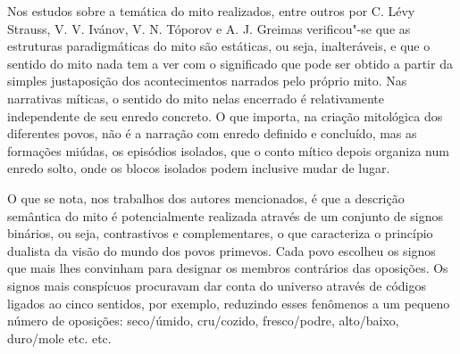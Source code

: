 Nos estudos sobre a temática do mito realizados, entre outros por C.
Lévy Strauss, V. V. Ivánov, V. N. Tóporov e A. J. Greimas
verificou"-se que as estruturas paradigmáticas do mito são estáticas, ou
seja, inalteráveis, e que o sentido do mito nada tem a ver com o
significado que pode ser obtido a partir da simples justaposição dos
acontecimentos narrados pelo próprio mito. Nas narrativas míticas, o
sentido do mito nelas encerrado é relativamente independente de seu
enredo concreto. O que importa, na criação mitológica dos diferentes
povos, não é a narração com enredo definido e concluído, mas as
formações miúdas, os episódios isolados, que o conto mítico depois
organiza num enredo solto, onde os blocos isolados podem inclusive mudar
de lugar.

O que se nota, nos trabalhos dos autores mencionados, é que a
descrição semântica do mito é potencialmente realizada através de um
conjunto de signos binários, ou seja, contrastivos e complementares,
o que caracteriza o princípio dualista da visão do mundo dos povos
primevos. Cada povo escolheu os signos que mais lhes convinham para
designar os membros contrários das oposições. Os signos mais conspícuos
procuravam dar conta do universo através de códigos ligados ao cinco
sentidos, por exemplo, reduzindo esses fenômenos a um pequeno número de
oposições: seco/úmido, cru/cozido, fresco/podre, alto/baixo, duro/mole
etc. etc.

